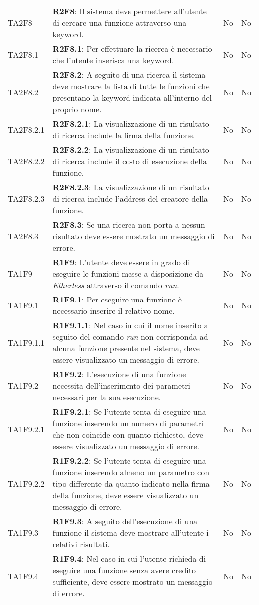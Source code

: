 \begin{longtable}{ 
		>{\centering}p{} 
		>{}p{} 
		>{\centering}p{}
		>{\centering}p{} }
	TA2F8 & \textbf{R2F8}: Il sistema deve permettere all'utente di cercare una funzione 
		attraverso una keyword. 													& No & No \tabularnewline
	TA2F8.1 & \textbf{R2F8.1}: Per effettuare la ricerca è necessario che l'utente inserisca 
		una keyword. 																& No & No \tabularnewline
	TA2F8.2 & \textbf{R2F8.2}: A seguito di una ricerca il sistema deve mostrare la lista di
	 tutte le funzioni che presentano la keyword indicata 
	 all'interno del proprio nome.													& No & No \tabularnewline
	TA2F8.2.1 & \textbf{R2F8.2.1}: La visualizzazione di un risultato di ricerca include
		 la firma della funzione.													& No & No \tabularnewline
  	TA2F8.2.2 & \textbf{R2F8.2.2}: La visualizzazione di un risultato di ricerca include
		  il costo di esecuzione della funzione.									& No & No \tabularnewline
  	TA2F8.2.3 & \textbf{R2F8.2.3}: La visualizzazione di un risultato di ricerca include
		  l'address del creatore della funzione.									& No & No \tabularnewline
	TA2F8.3 & \textbf{R2F8.3}: Se una ricerca non porta a nessun risultato deve essere mostrato un 
		messaggio di errore. 														& No & No \tabularnewline	
	
	TA1F9 & \textbf{R1F9}: L'utente deve essere in grado di eseguire le funzioni messe a 
		disposizione da \textit{Etherless} attraverso il comando \textit{run}. 		& No & No \tabularnewline
	TA1F9.1 & \textbf{R1F9.1}: Per eseguire una funzione è necessario inserire il relativo nome. 		& No & No \tabularnewline
	TA1F9.1.1 & \textbf{R1F9.1.1}: Nel caso in cui il nome inserito a seguito del comando \textit{run} non 
		corrisponda ad alcuna funzione presente nel sistema, deve essere 
		visualizzato un messaggio di errore.										& No & No \tabularnewline 
	TA1F9.2 & \textbf{R1F9.2}: L'esecuzione di una funzione necessita dell'inserimento dei parametri necessari per la sua esecuzione. 																	& No & No \tabularnewline
	TA1F9.2.1 & \textbf{R1F9.2.1}: Se l'utente tenta di eseguire una funzione inserendo un numero 
		di parametri che non coincide con quanto richiesto, deve essere 
		visualizzato un messaggio di errore. 										& No & No \tabularnewline
	TA1F9.2.2 & \textbf{R1F9.2.2}: Se l'utente tenta di eseguire una funzione inserendo almeno un parametro	con tipo differente da 
		quanto indicato nella firma della funzione, deve essere visualizzato
		un messaggio di errore. 													& No & No \tabularnewline
	TA1F9.3 & \textbf{R1F9.3}: A seguito dell'esecuzione di una funzione il sistema deve mostrare 
		all'utente i relativi risultati. 											& No & No \tabularnewline
	TA1F9.4 & \textbf{R1F9.4}: Nel caso in cui l'utente richieda di eseguire una funzione senza 
		avere credito sufficiente, deve essere mostrato un messaggio di errore.		& No & No \tabularnewline
	

\end{longtable}
